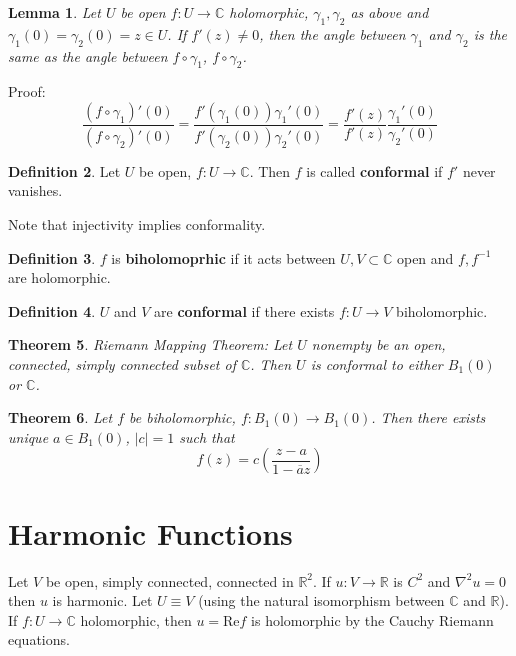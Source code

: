 \documentclass[11pt]{article}
\theoremstyle{plain}
\newtheorem{theorem}{Theorem}[section]
\newtheorem{lemma}[theorem]{Lemma}
\theoremstyle{definition}
\newtheorem{definition}[theorem]{Definition}
\newcommand{\re}[0]{\text{Re}}
\newcommand{\C}{\mathbb{C}}
\newcommand{\R}{\mathbb{R}}
\begin{document}
\begin{lemma}
Let $U$ be open $f: U \to \C$ holomorphic, $\gamma_1, \gamma_2$ as above and $\gamma_1(0) = \gamma_2(0) = z \in U$. If $f'(z) \neq 0$, then the angle between $\gamma_1$ and $\gamma_2$ is the same as the angle between $f \circ \gamma_1$, $f\circ \gamma_2$.
\end{lemma}

Proof: 
$$ \frac{(f\circ\gamma_1)'(0)}{(f\circ\gamma_2)'(0)} = \frac{f'(\gamma_1(0))\gamma_1'(0)}{f'(\gamma_2(0))\gamma_2'(0)} = \frac{f'(z)}{f'(z)} \frac{\gamma_1'(0)}{\gamma_2'(0)} $$

\begin{definition}
Let $U$ be open, $f: U \to \C$. Then $f$ is called \textbf{conformal} if $f'$ never vanishes. 
\end{definition}

Note that injectivity implies conformality. 

\begin{definition}
$f$ is \textbf{biholomoprhic} if it acts between $U, V \subset \C$ open and $f, f^{-1}$ are holomorphic. 
\end{definition}

\begin{definition}
$U$ and $V$ are \textbf{conformal} if there exists $f: U \to V$ biholomorphic.
\end{definition}

\begin{theorem}
Riemann Mapping Theorem: Let $U$ nonempty be an open, connected, simply connected subset of $\C$. Then $U$ is conformal to either $B_1(0)$ or $\C$.
\end{theorem}

\begin{theorem}
Let $f$ be biholomorphic, $f:B_1(0) \to B_1(0)$. Then there exists unique $a \in B_1(0)$, $|c| = 1$ such that 
$$ f(z) = c \left(\frac{z-a}{1 - \overline{a}z}\right) $$
\end{theorem}

\section{Harmonic Functions}
Let $V$ be open, simply connected, connected in $\R^2$. If $u: V \to \R$ is $C^2$ and $\nabla^2 u = 0$ then $u$ is harmonic. Let $U \equiv V$ (using the natural isomorphism between $\C$ and $\R$). If $f:U\to\C$ holomorphic, then $u = \re f$ is holomorphic by the Cauchy Riemann equations. 
\end{document}
